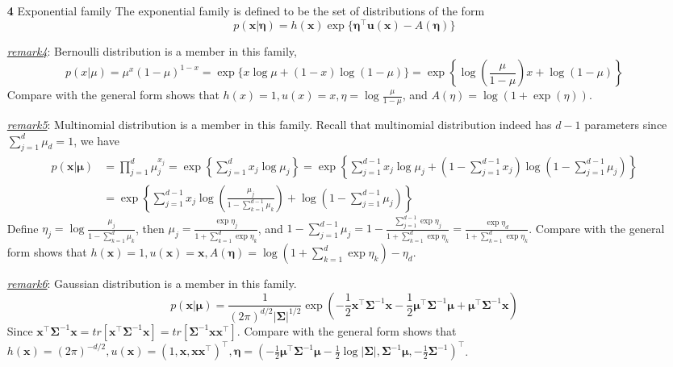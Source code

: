 \documentclass{article}
\begin{document}
\begin{itemize}
	
	
	\item [\textbf{4}] Exponential family
	The exponential family is defined to be the set of distributions of the form
	\begin{equation}
	p(\bm{x}|\bm{\eta}) = h(\bm{x}) \exp\{ \bm{\eta}^\top \bm{u}(\bm{x}) - A(\bm{\eta}) \}
	\end{equation}
	
	
	
	\begin{footnotesize}
	\textit{\underline{remark4}}: Bernoulli distribution is a member in this family,
	\begin{equation*}
	p(x|\mu) = \mu^x(1-\mu)^{1-x} = \exp \{ x \log \mu + (1-x) \log (1-\mu) \} = \exp\left\{ \log \left( \frac{\mu}{1-\mu}\right) x + \log(1-\mu)\right\}
	\end{equation*}
	Compare with the general form shows that $h(x)=1,u(x)=x, \eta=\log \frac{\mu}{1-\mu} $, and $A(\eta)=\log (1+\exp(\eta))$.

	\textit{\underline{remark5}}: Multinomial distribution is a member in this family. Recall that multinomial distribution indeed has $d-1$ parameters since $\sum_{j=1}^d \mu_d = 1$, we have
	\begin{equation*}
	\begin{split}
	p(\bm{x}|\bm{\mu}) &= \prod_{j=1}^d \mu_j^{x_j} = \exp\left\{ \sum_{j=1}^d x_j \log \mu_j \right\} = \exp\left\{ \sum_{j=1}^{d-1} x_j \log \mu_j + \left(1-\sum_{j=1}^{d-1} x_j \right) \log \left(1-\sum_{j=1}^{d-1} \mu_j \right) \right\} \\
	&= \exp\left\{ \sum_{j=1}^{d-1} x_j \log \left( \frac{\mu_j}{1-\sum_{k=1}^{d-1} \mu_k} \right) +  \log \left(1-\sum_{j=1}^{d-1} \mu_j \right) \right\}
	\end{split}
	\end{equation*}
	Define $\eta_j =  \log \frac{\mu_j}{1-\sum_{k=1}^d \mu_k}$, then $\mu_j = \frac{\exp\eta_j}{1+\sum_{k=1}^d \exp \eta_k}$, and $1-\sum_{j=1}^{d-1} \mu_j = 1-\frac{\sum_{j=1}^{d-1} \exp \eta_j}{1+\sum_{k=1}^d \exp \eta_k}=\frac{\exp \eta_{d}}{1+\sum_{k=1}^d \exp \eta_k}$. Compare with the general form shows that $h(\bm{x})=1, u(\bm{x})=\bm{x}, A(\bm{\eta})=\log (1+\sum_{k=1}^d \exp \eta_k)-\eta_d$.
	
	\textit{\underline{remark6}}: Gaussian distribution is a member in this family.
	\begin{equation*}
	p(\bm{x}|\bm{\mu}) = \frac{1}{(2\pi)^{d/2} |\bm{\Sigma}|^{1/2}} \exp \left( -\frac{1}{2} \bm{x}^\top \bm{\Sigma}^{-1} \bm{x}  -\frac{1}{2} \bm{\mu}^\top \bm{\Sigma}^{-1} \bm{\mu} + \bm{\mu}^\top \bm{\Sigma}^{-1} \bm{x} \right)
	\end{equation*}
	Since $\bm{x}^\top \bm{\Sigma}^{-1} \bm{x} = tr [\bm{x}^\top \bm{\Sigma}^{-1} \bm{x}] = tr [\bm{\Sigma}^{-1} \bm{x} \bm{x}^\top ]$. Compare with the general form shows that $h(\bm{x})=(2\pi)^{-d/2}, u(\bm{x})=(1, \bm{x}, \bm{x}\bm{x}^\top)^\top, \bm{\eta}=(-\frac{1}{2} \bm{\mu}^\top \bm{\Sigma}^{-1} \bm{\mu}-\frac{1}{2}\log|\bm{\Sigma}|, \bm{\Sigma}^{-1}\bm{\mu}, -\frac{1}{2} \bm{\Sigma}^{-1})^\top$.
	\end{footnotesize}
	

\end{itemize}
\end{document}
